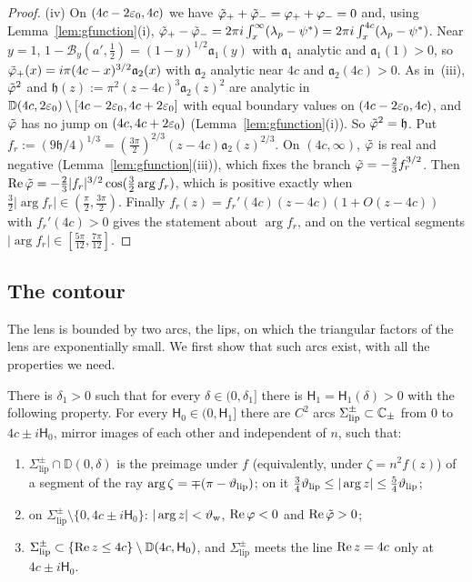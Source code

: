 \begin{proof}
(iv) On $(4c-2\varepsilon_0,4c)$ we have $\tilde\varphi_++\tilde\varphi_-=\varphi_++\varphi_-=0$ and, using
Lemma~\ref{lem:gfunction}(i), $\tilde\varphi_+-\tilde\varphi_-=2\pi i\int_x^\infty(\lambda_p-\psi^*)=2\pi i\int_x^{4c}(\lambda_p-\psi^*)$.
Near $y=1$, $1-\mathcal B_y(a',\frac12)=(1-y)^{1/2}\mathfrak a_1(y)$ with $\mathfrak a_1$ analytic and
$\mathfrak a_1(1)>0$, so $\tilde\varphi_+(x)=i\pi(4c-x)^{3/2}\mathfrak a_2(x)$ with $\mathfrak a_2$ analytic near $4c$ and
$\mathfrak a_2(4c)>0$. As in~(iii), $\tilde\varphi^2$ and $\mathfrak h(z):=\pi^2(z-4c)^3\mathfrak a_2(z)^2$ are analytic in
$\mathbb D(4c,2\varepsilon_0)\setminus[4c-2\varepsilon_0,4c+2\varepsilon_0]$ with equal boundary values on $(4c-2\varepsilon_0,4c)$, and $\tilde\varphi$ has no
jump on $(4c,4c+2\varepsilon_0)$ (Lemma~\ref{lem:gfunction}(i)). So $\tilde\varphi^2=\mathfrak h$. Put
$f_r:=(9\mathfrak h/4)^{1/3}=(\frac{3\pi}{2})^{2/3}(z-4c)\mathfrak a_2(z)^{2/3}$. On $(4c,\infty)$, $\tilde\varphi$ is real and
negative (Lemma~\ref{lem:gfunction}(iii)), which fixes the branch $\tilde\varphi=-\frac23f_r^{3/2}$. Then
$\operatorname{Re}\tilde\varphi=-\frac23|f_r|^{3/2}\cos(\frac32\arg f_r)$, which is positive exactly when
$\frac32|\arg f_r|\in(\frac\pi2,\frac{3\pi}2)$. Finally $f_r(z)=f_r'(4c)(z-4c)(1+O(z-4c))$ with $f_r'(4c)>0$ gives the
statement about $\arg f_r$, and on the vertical segments $|\arg f_r|\in[\frac{5\pi}{12},\frac{7\pi}{12}]$.
\end{proof}

\subsection{The contour}\label{sec:frame-contour}
The lens is bounded by two arcs, the lips, on which the triangular factors of the lens are exponentially small. We first
show that such arcs exist, with all the properties we need.

\begin{lemma}[Lips]\label{lem:lips}
There is $\delta_1>0$ such that for every $\delta\in(0,\delta_1]$ there is $\mathsf H_1=\mathsf H_1(\delta)>0$ with the following
property. For every $\mathsf H_0\in(0,\mathsf H_1]$ there are $C^2$ arcs $\Sigma^\pm_{\mathrm{lip}}\subset\mathbb{C}_\pm$ from $0$ to
$4c\pm i\mathsf H_0$, mirror images of each other and independent of $n$, such that:
\begin{enumerate}
\item[(a)] $\Sigma^\pm_{\mathrm{lip}}\cap \mathbb D(0,\delta)$ is the preimage under $f$ (equivalently, under $\zeta=n^2f(z)$) of
  a segment of the ray $\arg\zeta=\mp(\pi-\vartheta_{\mathrm{lip}})$; on it $\frac34\vartheta_{\mathrm{lip}}\le|\arg z|\le\frac54\vartheta_{\mathrm{lip}}$;
\item[(b)] on $\Sigma^\pm_{\mathrm{lip}}\setminus\{0,4c\pm i\mathsf H_0\}$: $|\arg z|<\vartheta_{\mathrm{w}}$, $\operatorname{Re}\varphi<0$ and $\operatorname{Re}\tilde\varphi>0$;
\item[(c)] $\Sigma^\pm_{\mathrm{lip}}\subset\{\operatorname{Re} z\le4c\}\setminus \mathbb D(4c,\mathsf H_0)$, and $\Sigma^\pm_{\mathrm{lip}}$ meets the
  line $\operatorname{Re} z=4c$ only at $4c\pm i\mathsf H_0$.
\end{enumerate}
\end{lemma}

